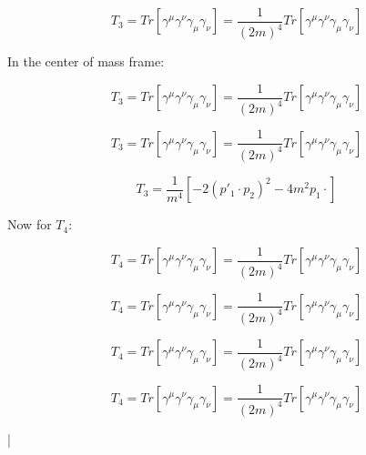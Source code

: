 \documentclass[a4]{article}
\begin{document}
    \begin{equation}
        T_3 = Tr [\gamma^\mu \gamma^\nu \gamma_\mu \gamma_\nu] = \frac{1}{(2 m)^4} Tr [\gamma^\mu \gamma^\nu \gamma_\mu \gamma_\nu]
    \end{equation}

    In the center of mass frame:

    \begin{equation}
        T_3 = Tr [\gamma^\mu \gamma^\nu \gamma_\mu \gamma_\nu] = \frac{1}{(2 m)^4} Tr [\gamma^\mu \gamma^\nu \gamma_\mu \gamma_\nu]
    \end{equation}

    \begin{equation}
        T_3 = Tr [\gamma^\mu \gamma^\nu \gamma_\mu \gamma_\nu] = \frac{1}{(2 m)^4} Tr [\gamma^\mu \gamma^\nu \gamma_\mu \gamma_\nu]
    \end{equation}

    \begin{framed}
        \begin{equation}
            T_3 = \frac{1}{m^4} [- 2 (p'_1 \cdot p_2)^2 - 4 m^2 p_1 \cdot]
        \end{equation}
    \end{framed}

    Now for $T_4$:

    \begin{equation}
        T_4 = Tr [\gamma^\mu \gamma^\nu \gamma_\mu \gamma_\nu] = \frac{1}{(2 m)^4} Tr [\gamma^\mu \gamma^\nu \gamma_\mu \gamma_\nu]
    \end{equation}

    \begin{equation}
        T_4 = Tr [\gamma^\mu \gamma^\nu \gamma_\mu \gamma_\nu] = \frac{1}{(2 m)^4} Tr [\gamma^\mu \gamma^\nu \gamma_\mu \gamma_\nu]
    \end{equation}

    \begin{equation}
        T_4 = Tr [\gamma^\mu \gamma^\nu \gamma_\mu \gamma_\nu] = \frac{1}{(2 m)^4} Tr [\gamma^\mu \gamma^\nu \gamma_\mu \gamma_\nu]
    \end{equation}

    \begin{equation}
        T_4 = Tr [\gamma^\mu \gamma^\nu \gamma_\mu \gamma_\nu] = \frac{1}{(2 m)^4} Tr [\gamma^\mu \gamma^\nu \gamma_\mu \gamma_\nu]
    \end{equation}

    \begin{framed}
        |
    \end{framed}
\end{document}
